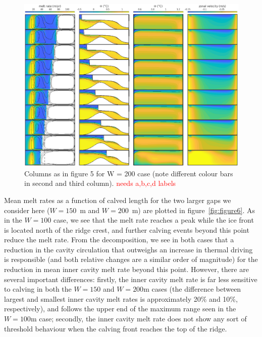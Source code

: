 \documentclass[draft]{agujournal2019}
\newcommand{\red}[1]{\textcolor{red}{#1}}
\begin{document}
\begin{figure}
    \centering
    \includegraphics[width = \textwidth]{../make_figures/plots/figure7.eps}
    \caption{Columns as in figure 5 for W = 200 case (note different colour bars in second and third column). \red{needs a,b,c,d labels}}
    \label{fig:figure7}
\end{figure}


Mean melt rates as a function of calved length for the two larger gaps we consider here ($W = 150$~m and $W = 200$~m) are plotted in figure~\ref{fig:figure6}. As in the $W = 100$ case, we see that the melt rate reaches a peak while the ice front is located north of the ridge crest, and further calving events beyond this point reduce the melt rate. From the decomposition, we see in both cases that a reduction in the cavity circulation that outweighs an increase in thermal driving is responsible (and both relative changes are a similar order of magnitude) for the reduction in mean inner cavity melt rate beyond this point.  However, there are several important differences: firstly, the inner cavity melt rate is far less sensitive to calving in both the $W = 150$ and $W = 200$m cases (the difference between largest and smallest inner cavity melt rates is approximately 20\% and 10\%, respectively), and follows the upper end of the maximum range seen in the $W = 100$m case; secondly, the inner cavity melt rate does not show any sort of threshold behaviour when the calving front reaches the top of the ridge.
\end{document}
